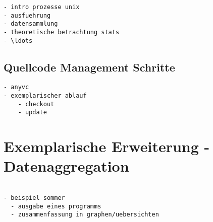 \begin{verbatim}
- intro prozesse unix
- ausfuehrung
- datensammlung
- theoretische betrachtung stats
- \ldots
\end{verbatim}

\subsection{Quellcode Management Schritte}


\begin{verbatim}
- anyvc
- exemplarischer ablauf
    - checkout
    - update
\end{verbatim}

\section{Exemplarische Erweiterung - Datenaggregation}

 
\begin{verbatim}

- beispiel sommer
  - ausgabe eines programms
  - zusammenfassung in graphen/uebersichten

\end{verbatim}

